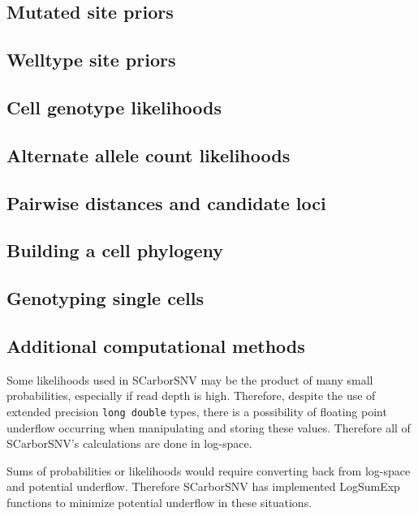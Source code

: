 \documentclass[../main.tex]{subfiles}
\begin{document}


%

\subsection{Mutated site priors}


\subsection{Welltype site priors}


\subsection{Cell genotype likelihoods}


\subsection{Alternate allele count likelihoods}


\subsection{Pairwise distances and candidate loci}


\subsection{Building a cell phylogeny}



\subsection{Genotyping single cells}


\subsection{Additional computational methods}
Some likelihoods used in SCarborSNV may be the product of many small probabilities, especially if read depth is high.
Therefore, despite the use of extended precision \texttt{long double} types, there is a possibility of floating point underflow occurring when manipulating and storing these values.
Therefore all of SCarborSNV's calculations are done in log-space.

Sums of probabilities or likelihoods would require converting back from log-space and potential underflow.
Therefore SCarborSNV has implemented LogSumExp functions to minimize potential underflow in these situations.
\end{document}

